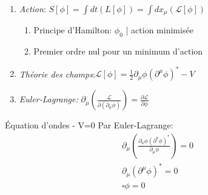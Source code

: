 \documentclass[handout]{beamer}
\begin{document}
\begin{frame}
\begin{enumerate}
\item \textit{Action}: $S[\phi] = \int{dt (L[\phi])}  =  \int{dx_\mu (\mathcal{L}[\phi])}$
\begin{enumerate}
\item Principe d'Hamilton: $\phi_0$ | action minimisée \\
\item Premier ordre nul pour un minimum d'action \\
\end{enumerate}
\item  \textit{Théorie des champs}:$\mathcal{L}[\phi] = \frac{1}{2} \partial_\mu \phi (\partial^\mu \phi)^* -V$
\item \textit{Euler-Lagrange:} $\partial_\mu \left(\frac{\mathcal{L}}{\partial(\partial_\mu\phi)}\right) = \frac{\partial\mathcal{L}}{\partial\phi}$
\end{enumerate}
\begin{exampleblock}{Équation d'ondes - V=0}
Par Euler-Lagrange:
\begin{align*}
 \partial_\mu(\frac{\partial_a\phi (\partial^a\phi)^* }{\partial_\mu \phi}) = 0 \\
\partial_\mu (\partial^\mu \phi)^*  = 0 \\
 \square \phi = 0 \\
\end{align*}

\end{exampleblock}

\end{frame}
\end{document}
